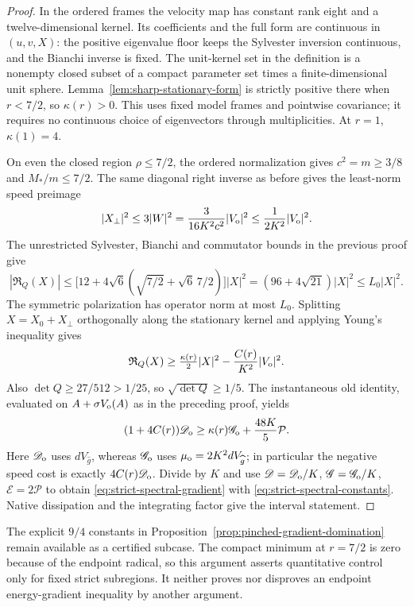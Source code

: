 \documentclass[11pt]{article}
\numberwithin{equation}{section}
\theoremstyle{definition}
\theoremstyle{remark}
\begin{document}
\begin{proof}
In the ordered frames the velocity map has constant rank
eight and a twelve-dimensional kernel. Its coefficients
and the full form are continuous in \((u,v,X)\):
the positive eigenvalue floor keeps the Sylvester inversion
continuous, and the Bianchi inverse is fixed.
The unit-kernel set in the definition is a nonempty closed
subset of a compact parameter set times a finite-dimensional
unit sphere. Lemma~\ref{lem:sharp-stationary-form} is strictly
positive there when \(r<7/2\), so \(\kappa(r)>0\).
This uses fixed model frames and pointwise covariance;
it requires no continuous choice of eigenvectors through
multiplicities. At \(r=1\), \(\kappa(1)=4\).

On even the closed region \(\rho\le7/2\), the ordered
normalization gives \(c^2=m\ge3/8\) and \(M_*/m\le7/2\).
The same diagonal right inverse as before gives the
least-norm speed preimage
\[
 |X_\perp|^2\le3|W|^2
       =\frac{3}{16K^2c^2}|V_{\rm o}|^2
       \le\frac1{2K^2}|V_{\rm o}|^2.
\]
The unrestricted Sylvester, Bianchi and commutator bounds
in the previous proof give
\[
 |\mathfrak R_Q(X)|\le
 \bigl[12+4\sqrt6(\sqrt{7/2}+\sqrt6\,7/2)\bigr]|X|^2
 =(96+4\sqrt{21})|X|^2\le L_0|X|^2.
\]
The symmetric polarization has operator norm at most \(L_0\).
Splitting \(X=X_0+X_\perp\) orthogonally along the stationary
kernel and applying Young's inequality gives
\[
 \mathfrak R_Q(X)\ge\tfrac{\kappa(r)}2|X|^2
                   -\frac{C(r)}{K^2}|V_{\rm o}|^2.
\]
Also \(\det Q\ge27/512>1/25\), so
\(\sqrt{\det Q}\ge1/5\). The instantaneous old identity,
evaluated on \(A+\sigma V_{\rm o}(A)\) as in the preceding
proof, yields
\[
 (1+4C(r))\mathscr D_{\rm o}
   \ge\kappa(r)\mathscr G_{\rm o}+\frac{48K}{5}\mathcal P.
\]
Here \(\mathscr D_{\rm o}\) uses \(dV_{\widehat g}\),
whereas \(\mathscr G_{\rm o}\) uses
\(\mu_{\rm o}=2K^2dV_{\widehat g}\); in particular the
negative speed cost is exactly \(4C(r)\mathscr D_{\rm o}\).
Divide by \(K\) and use
\(\mathscr D=\mathscr D_{\rm o}/K\),
\(\mathscr G=\mathscr G_{\rm o}/K\),
\(\mathscr E=2\mathcal P\) to obtain
\eqref{eq:strict-spectral-gradient} with
\eqref{eq:strict-spectral-constants}.
Native dissipation and the integrating factor give the
interval statement.
\end{proof}

The explicit \(9/4\) constants in
Proposition~\ref{prop:pinched-gradient-domination} remain
available as a certified subcase. The compact minimum at
\(r=7/2\) is zero because of the endpoint radical, so this
argument asserts quantitative control only for fixed
strict subregions. It neither proves nor disproves an
endpoint energy-gradient inequality by another argument.
\end{document}

